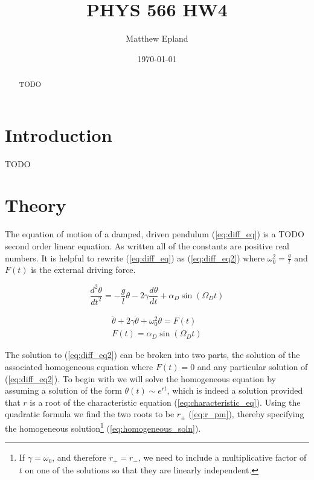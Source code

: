 \documentclass[notitlepage,aps,prd,nofootinbib]{revtex4-1}
\begin{document}
\title{PHYS 566 HW4}
\author{Matthew Epland}

\date{\today}

\begin{abstract}
TODO

\end{abstract}\maketitle


\section{Introduction}
\label{sec:intro}
TODO

\section{Theory}
\label{sec:theory}
The equation of motion of a damped, driven pendulum (\ref{eq:diff_eq}) is a TODO second order linear equation. As written all of the constants are positive real numbers. It is helpful to rewrite (\ref{eq:diff_eq}) as (\ref{eq:diff_eq2}) where $\omega_{0}^2 = \frac{g}{l}$ and $F\left(t\right)$ is the external driving force.

\begin{equation} \label{eq:diff_eq}
\frac{d^2 \theta}{d t^2} = -\frac{g}{l}\theta - 2\gamma\frac{d \theta}{d t} + \alpha_{D}\sin\left(\Omega_{D} t\right)
\end{equation}

\begin{equation} \label{eq:diff_eq2} 
\begin{gathered}
\ddot{\theta} + 2\gamma \dot{\theta} + \omega_{0}^2 \theta = F\left(t\right) \\
F\left(t\right) = \alpha_{D} \sin\left(\Omega_{D} t\right)
\end{gathered}
\end{equation}

The solution to (\ref{eq:diff_eq2}) can be broken into two parts, the solution of the associated homogeneous equation where $F\left(t\right) = 0$ and any particular solution of (\ref{eq:diff_eq2}). To begin with we will solve the homogeneous equation by assuming a solution of the form $\theta\left(t\right) \sim e^{r t}$, which is indeed a solution provided that $r$ is a root of the characteristic equation (\ref{eq:characteristic_eq}). Using the quadratic formula we find the two roots to be $r_{\pm}$ (\ref{eq:r_pm}), thereby specifying the homogeneous solution\footnote{If $\gamma = \omega_{0}$, and therefore $r_{+} = r_{-}$, we need to include a multiplicative factor of $t$ on one of the solutions so that they are linearly independent.} (\ref{eq:homogeneous_soln}). 
\end{document}
